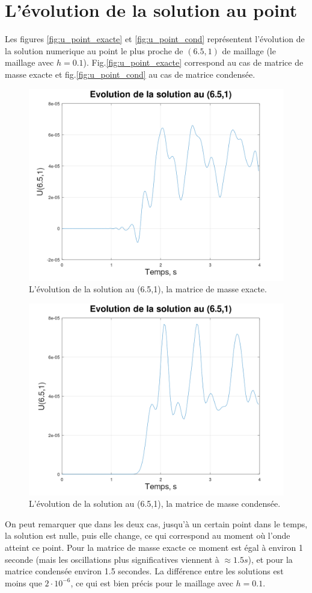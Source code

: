 \documentclass[12pt]{article}
\begin{document}
\section{L'évolution de la solution au point}
Les figures \eqref{fig:u_point_exacte} et \eqref{fig:u_point_cond} représentent l'évolution de la solution numerique au point le plus proche de $(6.5,1)$ de maillage (le maillage avec $h=0.1$). Fig.\eqref{fig:u_point_exacte} correspond au cas de matrice de masse exacte et fig.\eqref{fig:u_point_cond} au cas de matrice condensée.
\begin{figure}[H]
	\centering
	\includegraphics[height=0.4\linewidth]{images/u_6,5,1}
	\caption{L'évolution de la solution au (6.5,1), la matrice de masse exacte.}
	\label{fig:u_point_exacte}
\end{figure}
\begin{figure}[H]
	\centering
	\includegraphics[height=0.4\linewidth]{images/u_6,5,1_condense}
	\caption{L'évolution de la solution au (6.5,1), la matrice de masse condensée.}
	\label{fig:u_point_cond}
\end{figure}
On peut remarquer que dans les deux cas, jusqu'à un certain point dans le temps, la solution est nulle, puis elle change, ce qui correspond au moment où l'onde atteint ce point. Pour la matrice de masse exacte ce moment est égal à environ 1 seconde (mais les oscillations plus significatives viennent à $\approx 1.5 s$), et pour la matrice condensée environ 1.5 secondes. La différence entre les solutions est moins que $2\cdot10^{-6}$, ce qui est bien précis pour le maillage avec $h=0.1$. 
\end{document}
